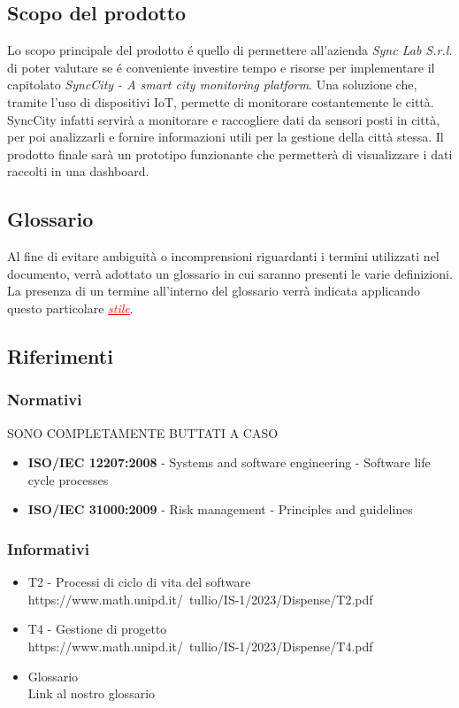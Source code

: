 \documentclass[italian,12pt]{article} %
\begin{document}
\subsection{Scopo del prodotto}
Lo scopo principale del prodotto é quello di permettere all’azienda \textit{Sync Lab S.r.l.} di poter valutare se é conveniente investire tempo e risorse per implementare il capitolato \textit{SyncCity - A smart city monitoring platform}. Una soluzione che, tramite l'uso di dispositivi IoT, permette di monitorare costantemente le città. SyncCity infatti servirà a monitorare e raccogliere dati da sensori posti in città, per poi analizzarli e fornire informazioni utili per la gestione della città stessa. Il prodotto finale sarà un prototipo funzionante che permetterà di visualizzare i dati raccolti in una dashboard.

\subsection{Glossario}
Al fine di evitare ambiguità o incomprensioni riguardanti i termini utilizzati nel documento, verrà adottato un glossario in cui saranno presenti le varie definizioni. La presenza di un termine all'interno del glossario verrà indicata applicando questo particolare \textcolor{red}{\uline{\textit{stile}}}.
\subsection{Riferimenti}
    \subsubsection{Normativi}SONO COMPLETAMENTE BUTTATI A CASO
        \begin{itemize}
            \item \textbf{ISO/IEC 12207:2008} - Systems and software engineering - Software life cycle processes
            \item \textbf{ISO/IEC 31000:2009} - Risk management - Principles and guidelines
        \end{itemize}
    \subsubsection{Informativi}
        \begin{itemize}
            \item T2 - Processi di ciclo di vita del software\\ https://www.math.unipd.it/~tullio/IS-1/2023/Dispense/T2.pdf
            \item T4 - Gestione di progetto\\ https://www.math.unipd.it/~tullio/IS-1/2023/Dispense/T4.pdf
            \item Glossario\\ Link al nostro glossario
        \end{itemize}
\end{document}
